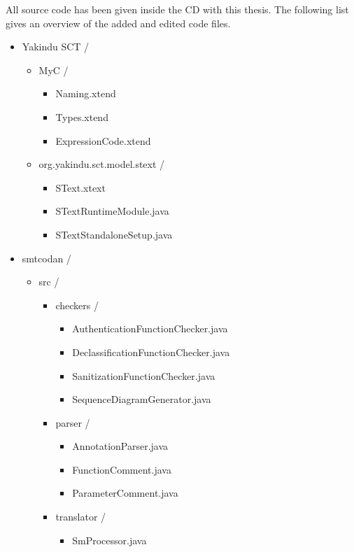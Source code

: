 All source code has been given inside the CD with this thesis. The following list gives an overview of the added and edited code files.
\begin{itemize}
	\item Yakindu SCT /
	       \begin{itemize}
	       	 \item MyC /
		       	  \begin{itemize}
		       	  	\item Naming.xtend
		       	  	\item Types.xtend
		       	  	\item ExpressionCode.xtend
		       	  \end{itemize}
			    \item org.yakindu.sct.model.stext /	 \begin{itemize}
			      	\item SText.xtext
			      	\item STextRuntimeModule.java
			      	\item STextStandaloneSetup.java
			     \end{itemize}      	  	
	       \end{itemize}
	  \item smtcodan /
	       \begin{itemize}
	       	\item src /
	       	    \begin{itemize}	       	    
			       	\item checkers /
			       	   \begin{itemize}
			       	   	\item AuthenticationFunctionChecker.java
			       	   	\item DeclassificationFunctionChecker.java
			       	   	\item SanitizationFunctionChecker.java	       	   	
			       	   	\item SequenceDiagramGenerator.java 	   	     		
			       	   \end{itemize} 
			       	 \item parser /
			       	    \begin{itemize}
			       	    	\item AnnotationParser.java
			       	    	\item FunctionComment.java
			       	    	\item ParameterComment.java
			       	    \end{itemize}
			       	  \item translator /
			       	     	\begin{itemize}
			       	     		\item SmProcessor.java			       	     		
			       	     	\end{itemize}
			      \end{itemize}    
			 \end{itemize}
			      	
	       	
\end{itemize}